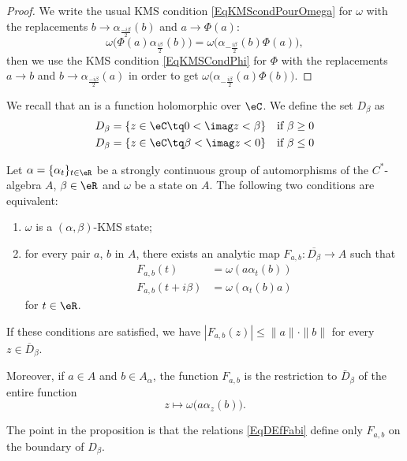 \begin{proof}
	We write the usual KMS condition \eqref{EqKMScondPourOmega} for $\omega$ with the replacements $b\to \alpha_{\frac{ -i\beta }{2}}(b)$ and $a\to \Phi(a)$:
	\begin{equation}
		\omega\big( \Phi(a)\alpha_{\frac{ i\beta }{2}}(b) \big)=\omega\big( \alpha_{-\frac{ i\beta }{2}}(b)\Phi(a) \big),
	\end{equation}
	then we use the KMS condition \eqref{EqKMSCondPhi} for $\Phi$ with the replacements $a\to b$ and $b\to\alpha_{\frac{ -i\beta }{2}}(a)$ in order to get $\omega\big( \alpha_{-\frac{ i\beta }{2}}(a)\Phi(b) \big)$.
\end{proof}

We recall that an  is a function holomorphic over $\eC$. We define the set $D_{\beta}$ as
\begin{equation}
	\begin{aligned}[]
		D_{\beta}&=\{ z\in\eC\tq 0<\imag z<\beta \}	&\text{if }\beta\geq 0\\
		D_{\beta}&=\{ z\in\eC\tq \beta<\imag z<0 \}	&\text{if }\beta\leq 0
	\end{aligned}
\end{equation}

\begin{proposition}
	Let $\alpha=\{ \alpha_t \}_{t\in\eR}$ be a strongly continuous group of automorphisms of the $C^*$-algebra $A$, $\beta\in\eR$ and $\omega$ be a state on $A$. The following two conditions are equivalent:
	\begin{enumerate}
		\item
			$\omega$ is a $(\alpha,\beta)$-KMS state;
		\item
			for every pair $a$, $b$ in $A$, there exists an analytic map $F_{a,b}\colon \overline{ D_{\beta} }\to A$ such that
			\begin{subequations}		\label{EqDEfFabi}
				\begin{align}
					F_{a,b}(t)&=\omega(a\alpha_t(b))\\
					F_{a,b}(t+i\beta)&=\omega(\alpha_t(b)a)
				\end{align}
			\end{subequations}
			for $t\in\eR$.
	\end{enumerate}
	If these conditions are satisfied, we have $| F_{a,b}(z) |\leq\| a \|\cdot\| b \|$ for every $z\in\overline{ D }_{\beta}$.

	Moreover, if $a\in A$ and $b\in A_{\alpha}$, the function $F_{a,b}$ is the restriction to $\bar D_{\beta}$ of the entire function 
	\begin{equation}
		z\mapsto\omega\big( a\alpha_z(b) \big).
	\end{equation}
\end{proposition}
The point in the proposition is that the relations \eqref{EqDEfFabi} define only $F_{a,b}$ on the boundary of $D_{\beta}$.

